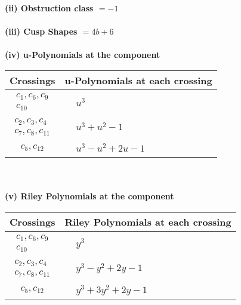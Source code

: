 \documentclass[1p]{elsarticle_modified}
\theoremstyle{definition}
\begin{document}
\flushleft \textbf{(ii) Obstruction class $= -1$}\\~\\
\flushleft \textbf{(iii) Cusp Shapes $= 4 b+6$}\\~\\
\newpage\renewcommand{\arraystretch}{1}
\flushleft \textbf{(iv) u-Polynomials at the component}\newline \\
\begin{tabular}{m{50pt}|m{274pt}}
Crossings & \hspace{64pt}u-Polynomials at each crossing \\
\hline $$\begin{aligned}c_{1},c_{6},c_{9}\\c_{10}\end{aligned}$$&$\begin{aligned}
&u^3
\end{aligned}$\\
\hline $$\begin{aligned}c_{2},c_{3},c_{4}\\c_{7},c_{8},c_{11}\end{aligned}$$&$\begin{aligned}
&u^3+u^2-1
\end{aligned}$\\
\hline $$\begin{aligned}c_{5},c_{12}\end{aligned}$$&$\begin{aligned}
&u^3- u^2+2 u-1
\end{aligned}$\\
\hline
\end{tabular}\\~\\
\newpage\renewcommand{\arraystretch}{1}
\flushleft \textbf{(v) Riley Polynomials at the component}\newline \\
\begin{tabular}{m{50pt}|m{274pt}}
Crossings & \hspace{64pt}Riley Polynomials at each crossing \\
\hline $$\begin{aligned}c_{1},c_{6},c_{9}\\c_{10}\end{aligned}$$&$\begin{aligned}
&y^3
\end{aligned}$\\
\hline $$\begin{aligned}c_{2},c_{3},c_{4}\\c_{7},c_{8},c_{11}\end{aligned}$$&$\begin{aligned}
&y^3- y^2+2 y-1
\end{aligned}$\\
\hline $$\begin{aligned}c_{5},c_{12}\end{aligned}$$&$\begin{aligned}
&y^3+3 y^2+2 y-1
\end{aligned}$\\
\hline
\end{tabular}\\~\\
\end{document}
